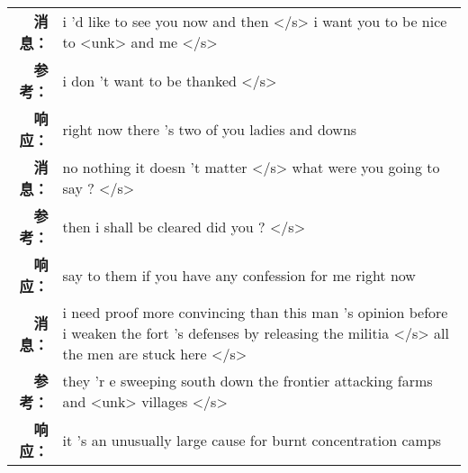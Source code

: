 \begin{tabularx}{\textwidth}{@{}rX@{}}
\midrule%
\textbf{消息：}&i 'd like to see you now and then </s> i want you to be nice to <unk> and me  </s>\\%
\textbf{参考：}& i don 't want to be thanked </s>\\%
\textbf{响应：}&right now there 's two of you ladies and downs\\%
\midrule%
\textbf{消息：}&no nothing it doesn 't matter </s> what were you going to say ?  </s>\\%
\textbf{参考：}& then i shall be cleared did you ? </s>\\%
\textbf{响应：}&say to them if you have any confession for me right now\\%
\midrule%
\textbf{消息：}&i need proof more convincing than this man 's opinion before i weaken the fort 's defenses by releasing the militia </s> all the men are stuck here  </s>\\%
\textbf{参考：}& they 'r e sweeping south down the frontier attacking farms and <unk> villages </s>\\%
\textbf{响应：}&it 's an unusually large cause for burnt concentration camps\\%
\midrule\bottomrule%
%
\end{tabularx}